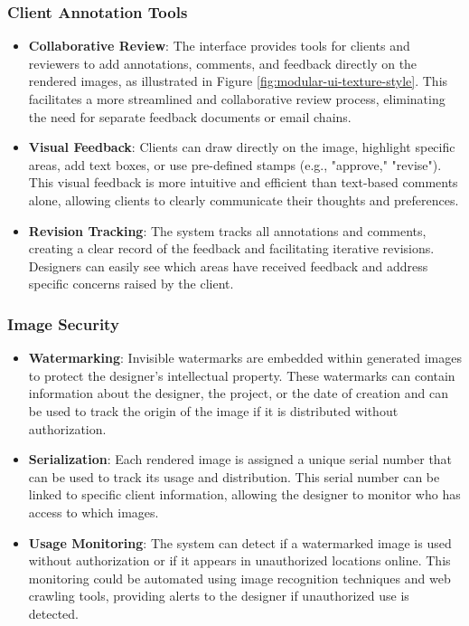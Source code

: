 \documentclass{article}
\begin{document}
\subsubsection{Client Annotation Tools}
\begin{itemize}
\item \textbf{Collaborative Review}: The interface provides tools for clients and reviewers to add annotations, comments, and feedback directly on the rendered images, as illustrated in Figure \ref{fig:modular-ui-texture-style}. This facilitates a more streamlined and collaborative review process, eliminating the need for separate feedback documents or email chains.
\item \textbf{Visual Feedback}: Clients can draw directly on the image, highlight specific areas, add text boxes, or use pre-defined stamps (e.g., "approve," "revise"). This visual feedback is more intuitive and efficient than text-based comments alone, allowing clients to clearly communicate their thoughts and preferences.
\item \textbf{Revision Tracking}: The system tracks all annotations and comments, creating a clear record of the feedback and facilitating iterative revisions. Designers can easily see which areas have received feedback and address specific concerns raised by the client.
\end{itemize}


\subsubsection{Image Security}
\begin{itemize}
\item \textbf{Watermarking}: Invisible watermarks are embedded within generated images to protect the designer's intellectual property. These watermarks can contain information about the designer, the project, or the date of creation and can be used to track the origin of the image if it is distributed without authorization.
\item \textbf{Serialization}: Each rendered image is assigned a unique serial number that can be used to track its usage and distribution. This serial number can be linked to specific client information, allowing the designer to monitor who has access to which images.
\item \textbf{Usage Monitoring}: The system can detect if a watermarked image is used without authorization or if it appears in unauthorized locations online. This monitoring could be automated using image recognition techniques and web crawling tools, providing alerts to the designer if unauthorized use is detected.
\end{itemize}
\end{document}
